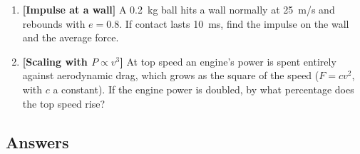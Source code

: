 \begin{enumerate}[label=\textbf{\arabic*.},itemsep=4pt]
\item \textbf{[Impulse at a wall]} A \SI{0.2}{kg} ball hits a wall normally at \SI{25}{m/s} and rebounds
with $e=0.8$. If contact lasts \SI{10}{ms}, find the impulse on the wall and the average force.

\item \textbf{[Scaling with $P\propto v^3$]} At top speed an engine's power is spent entirely against
aerodynamic drag, which grows as the square of the speed ($F=cv^2$, with $c$ a constant). If the engine
power is doubled, by what percentage does the top speed rise?
\end{enumerate}

\subsection*{Answers}
